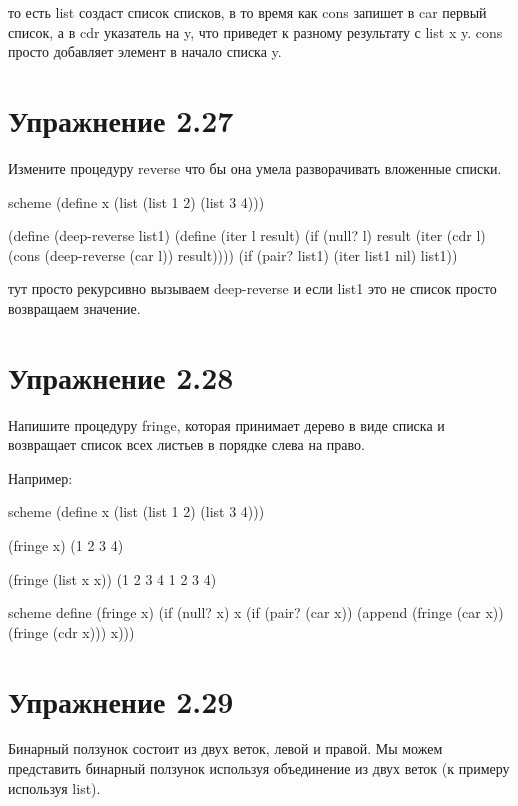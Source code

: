 то есть list создаст список списков, в то время как cons запишет в car первый список, а в cdr указатель на y, что приведет к разному результату с list x y. cons просто добавляет элемент в начало списка y.

\chapter{Упражнение 2.27}

Измените процедуру reverse что бы она умела разворачивать вложенные списки.
\begin{codelisting}{scheme}
(define x (list (list 1 2) (list 3 4)))

(define (deep-reverse list1)
  (define (iter l result)
    (if (null? l)
        result
        (iter (cdr l) (cons (deep-reverse (car l)) result))))
  (if (pair? list1)
      (iter list1 nil)
      list1))
\end{codelisting}

тут просто рекурсивно вызываем deep-reverse и если list1 это не список просто возвращаем значение.

\chapter{Упражнение 2.28}

Напишите процедуру fringe, которая принимает дерево в виде списка и возвращает список всех листьев в порядке слева на право.

Например:
\begin{codelisting}{scheme}
(define x (list (list 1 2) (list 3 4)))

(fringe x)
(1 2 3 4)

(fringe (list x x))
(1 2 3 4 1 2 3 4)
\end{codelisting}


\begin{codelisting}{scheme}
define (fringe x)
  (if (null? x)
      x
      (if (pair? (car x))
          (append (fringe (car x)) (fringe (cdr x)))
          x)))
\end{codelisting}

\chapter{Упражнение 2.29}

Бинарный ползунок состоит из двух веток, левой и правой. Мы можем представить бинарный ползунок используя объединение из двух веток (к примеру используя list).


